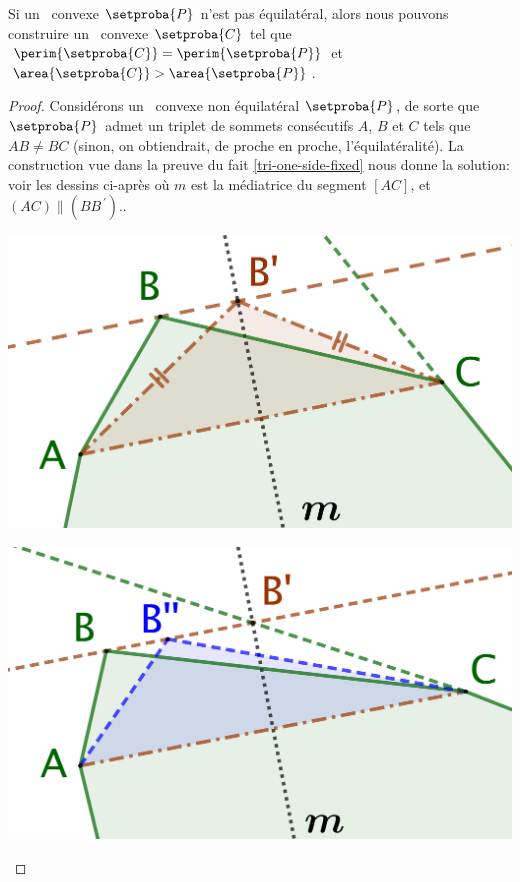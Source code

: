 

\begin{fact} \label{must-be-equi}
    Si un \ngone\ convexe $\setproba{P}$ n'est pas équilatéral,
    alors nous pouvons construire un \ngone\ convexe $\setproba{C}$ tel que
    $\perim{\setproba{C}} = \perim{\setproba{P}}$
    et
    $\area{\setproba{C}} > \area{\setproba{P}}$.
\end{fact}


\begin{proof}
    Considérons un \ngone\ convexe non équilatéral $\setproba{P}$,
    de sorte que $\setproba{P}$ admet un triplet de sommets consécutifs $A$, $B$ et $C$ tels que $AB \neq BC$
    (sinon, on obtiendrait, de proche en proche, l'équilatéralité).
    La construction vue dans la preuve du fait \ref{tri-one-side-fixed} nous donne la solution: voir les dessins ci-après où
    $m$ est la médiatrice du segment $[AC]$,
    et
    $(AC) \parallel (BB^{\,\prime})$..
    \begin{multicols}{2}
        \centering

        \includegraphics[scale=.35]{content/polygon/sol-must-be/not-iso-IN.png}

        \includegraphics[scale=.35]{content/polygon/sol-must-be/not-iso-BORDER.png}
    \end{multicols}



\end{proof}
